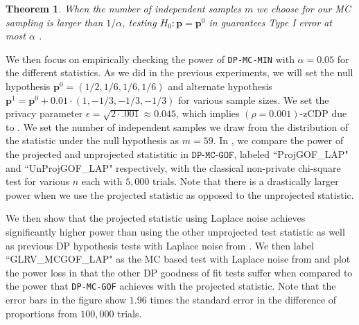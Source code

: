\documentclass[twoside,letterpaper]{article} \usepackage{aistats2017}
\newtheorem{theorem}{Theorem}[section]
\theoremstyle{definition}
\theoremstyle{remark}
\begin{document}
\begin{theorem}
When the number of independent samples $m$ we choose for our MC sampling is larger than $1/\alpha$, testing $H_0:{\mathbf{p}} = {{\mathbf{p}}^0}$ in  guarantees Type I error at most $\alpha$ .
\end{theorem}

We then focus on empirically checking the power of \texttt{DP-MC-MIN} with $\alpha = 0.05$ for the different statistics.  As we did in the previous experiments, we will set the null hypothesis ${{\mathbf{p}}^0} = (1/2,1/6,1/6,1/6)$ and alternate hypothesis ${\mathbf{p}}^1 = {{\mathbf{p}}^0} + 0.01 \cdot (1,-1/3,-1/3,-1/3)$ for various sample sizes.  We set the privacy parameter $\epsilon = \sqrt{2\cdot .001} \approx 0.045$, which implies $(\rho = 0.001)$-zCDP due to .  We set the number of independent samples we draw from the distribution of the statistic under the null hypothesis as $m = 59$.   In , we compare the power of the projected and unprojected statistitic in $\texttt{DP-MC-GOF}$, labeled ``ProjGOF\_LAP" and ``UnProjGOF\_LAP" respectively, with the classical non-private chi-square test for various $n$ each with $5,000$ trials.  Note that there is a drastically larger power when we use the projected statistic as opposed to the unprojected statistic.  

We then show that the projected statistic using Laplace noise achieves significantly higher power than using the other unprojected test statistic as well as previous DP hypothesis tests with Laplace noise from \cite{GLRV16}.  We then label ``GLRV\_MCGOF\_LAP" as the MC based test with Laplace noise from \cite{GLRV16} and plot the power loss in  that the other DP goodness of fit tests suffer when compared to the power that \texttt{DP-MC-GOF} achieves with the projected statistic.  Note that the error bars in the figure show $1.96$ times the standard error in the difference of proportions from $100,000$ trials.
\end{document}
